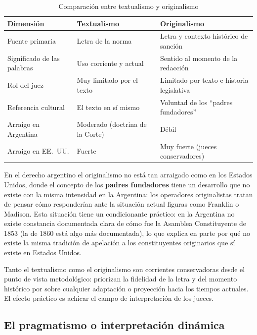 \documentclass[12pt,oneside]{book}
\begin{document}
\begin{table}[H]
\centering
\small
\caption{Comparación entre textualismo y originalismo}
\begin{tabularx}{\textwidth}{Q{0.24\textwidth}YY}
\toprule
\textbf{Dimensión} & \textbf{Textualismo} & \textbf{Originalismo} \\
\midrule
Fuente primaria & Letra de la norma & Letra y contexto histórico de sanción \\
Significado de las palabras & Uso corriente y actual & Sentido al momento de la redacción \\
Rol del juez & Muy limitado por el texto & Limitado por texto e historia legislativa \\
Referencia cultural & El texto en sí mismo & Voluntad de los ``padres fundadores'' \\
Arraigo en Argentina & Moderado (doctrina de la Corte) & Débil \\
Arraigo en EE.\ UU. & Fuerte & Muy fuerte (jueces conservadores) \\
\bottomrule
\end{tabularx}
\end{table}

En el derecho argentino el originalismo no está tan arraigado como en los Estados Unidos, donde el concepto de los \textbf{padres fundadores} tiene un desarrollo que no existe con la misma intensidad en la Argentina: los operadores originalistas tratan de pensar cómo responderían ante la situación actual figuras como Franklin o Madison. Esta situación tiene un condicionante práctico: en la Argentina no existe constancia documentada clara de cómo fue la Asamblea Constituyente de 1853 (la de 1860 está algo más documentada), lo que explica en parte por qué no existe la misma tradición de apelación a los constituyentes originarios que sí existe en Estados Unidos.

\begin{important}
Tanto el textualismo como el originalismo son corrientes conservadoras desde el punto de vista metodológico: priorizan la fidelidad de la letra y del momento histórico por sobre cualquier adaptación o proyección hacia los tiempos actuales. El efecto práctico es achicar el campo de interpretación de los jueces.
\end{important}

\subsection{El pragmatismo o interpretación dinámica}
\end{document}
